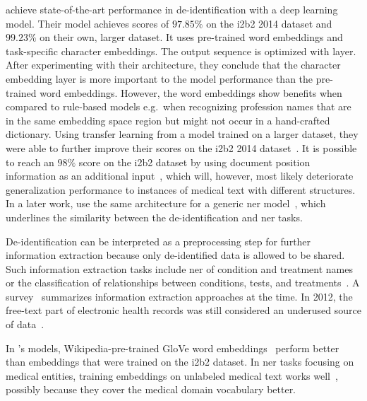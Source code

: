 %
\citet{dernoncourt2017identification} achieve state-of-the-art performance in de-identification with a deep learning model.
%
Their model achieves \fone scores of $97.85\%$ on the i2b2 2014 dataset and $99.23\%$ on their own, larger dataset.
%
It uses pre-trained word embeddings and task-specific character embeddings.
%
The output sequence is optimized with  layer.
%
After experimenting with their architecture, they conclude that the character embedding layer is more important to the model performance than the pre-trained word embeddings.
%
However, the word embeddings show benefits when compared to rule-based models e.g.\ when recognizing profession names that are in the same embedding space region but might not occur in a hand-crafted dictionary.
%
Using transfer learning from a model trained on a larger dataset, they were able to further improve their scores on the i2b2 2014 dataset~\citep{lee2017transfer}.
%
It is possible to reach an $98\%$ \fone score on the i2b2 dataset by using document position information as an additional input~\citep{zhao2018leveraging}, which will, however, most likely deteriorate generalization performance to instances of medical text with different structures.
%
In a later work, \citeauthor{dernoncourt2017identification} use the same architecture for a generic \ac{ner} model~\citep{dernoncourt2017neuroner}, which underlines the similarity between the de-identification and \ac{ner} tasks.

%
De-identification can be interpreted as a preprocessing step for further information extraction because only de-identified data is allowed to be shared.
%
Such information extraction tasks include \ac{ner} of condition and treatment names~\citep{uzuner2010extracting,pradhan2014semeval} or the classification of relationships between conditions, tests, and treatments~\citep{uzuner2011challenge}.
%
A survey~\citep{meystre2008extracting} summarizes information extraction approaches at the time.
%
In 2012, the free-text part of electronic health records was still considered an underused source of data~\citep{jensen2012mining}.

%
In \citeauthor{dernoncourt2017identification}'s models, Wikipedia-pre-trained GloVe word embeddings~\citep{pennington2014glove} perform better than embeddings that were trained on the i2b2 dataset.
%
In \ac{ner} tasks focusing on medical entities, training embeddings on unlabeled medical text works well~\citep{wu2015study}, possibly because they cover the medical domain vocabulary better.

